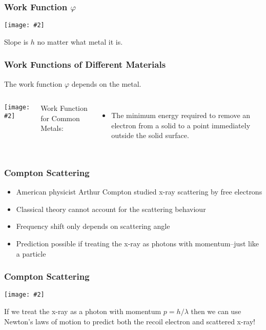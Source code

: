 \documentclass[12pt,compress,aspectratio=169]{beamer}
\newcommand{\pic}[2]{\texttt{[image: \#2]}}
\begin{document}
\begin{frame}
  \frametitle{Work Function $\varphi$}
  \begin{center}
    \pic{.6}{550px-Photoelectric_effect_diagram.png}
  \end{center}
  Slope is $h$ no matter what metal it is.
\end{frame}

\begin{frame}
  \frametitle{Work Functions of Different Materials}
  The work function $\varphi$ depends on the metal.
  \begin{columns}
    \pic{1}{work-function.png}
    
    Work Function for Common Metals:
    \begin{itemize}
    \item The minimum energy required to remove an electron from a solid to a
      point immediately outside the solid surface.
    \end{itemize}
  \end{columns}
\end{frame}


\begin{frame}
  \frametitle{Compton Scattering}
  \begin{itemize}
  \item American physicist Arthur Compton studied x-ray scattering by
    free electrons
  \item Classical theory cannot account for the scattering behaviour
  \item Frequency shift only depends on scattering angle
  \item Prediction possible if treating the x-ray as photons with
    momentum--just like a particle
  \end{itemize}

\end{frame}

\begin{frame}
  \frametitle{Compton Scattering}
  \begin{center}
    \pic{.5}{compton2.png}
  \end{center}
  If we treat the x-ray as a photon with momentum $p=h/\lambda$ then we can
  use Newton's laws of motion to predict both the recoil electron and scattered
  x-ray!
\end{frame}
\end{document}
